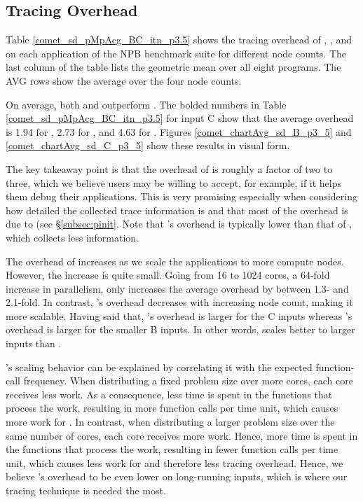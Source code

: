 

\subsection{Tracing Overhead}
\label{subsec:lowtoh}


Table \ref{comet_sd_pMpAcg_BC_itn_p3.5} shows the tracing overhead of \parlotm, \parlota, and \callgrind on each application of the NPB benchmark suite for different node counts. The last column of the table lists the geometric mean over all eight programs. The AVG rows show the average over the four node counts.


On average, both \parlotm and \parlota outperform \callgrind. The bolded numbers in Table \ref{comet_sd_pMpAcg_BC_itn_p3.5} for input C show that the average overhead is 1.94 for \parlotm, 2.73 for \parlota, and 4.63 for \callgrind. Figures \ref{comet_chartAvg_sd_B_p3_5} and \ref{comet_chartAvg_sd_C_p3_5} show these results in visual form.


The key takeaway point is that the overhead of \parlot is roughly a factor of two to three, which we believe users may be willing to accept, for example, if it helps them debug their applications. This is very promising especially when considering how detailed the collected trace information is and that most of the overhead is due to \pin (see \S\ref{subsec:pinit}. Note that \parlot 's overhead is typically lower than that of \callgrind, which collects less information.

The overhead of \parlot increases as we scale the applications to more compute nodes. However, the increase is quite small. Going from 16 to 1024 cores, a 64-fold increase in parallelism, only increases the average overhead by between 1.3- and 2.1-fold. In contrast, \callgrind 's overhead decreases with increasing node count, making it more scalable. Having said that, \callgrind 's overhead is larger for the C inputs whereas \parlot 's overhead is larger for the smaller B inputs. In other words, \parlot scales better to larger inputs than \callgrind.



\parlot 's scaling behavior can be explained by correlating it with the expected function-call frequency. When distributing a fixed problem size over more cores, each core receives less work. As a consequence, less time is spent in the functions that process the work, resulting in more function calls per time unit, which causes more work for \parlot. In contrast, when distributing a larger problem size over the same number of cores, each core receives more work. Hence, more time is spent in the functions that process the work, resulting in fewer function calls per time unit, which causes less work for \parlot and therefore less tracing overhead. Hence, we believe \parlot 's overhead to be even lower on long-running inputs, which is where our tracing technique is needed the most.


